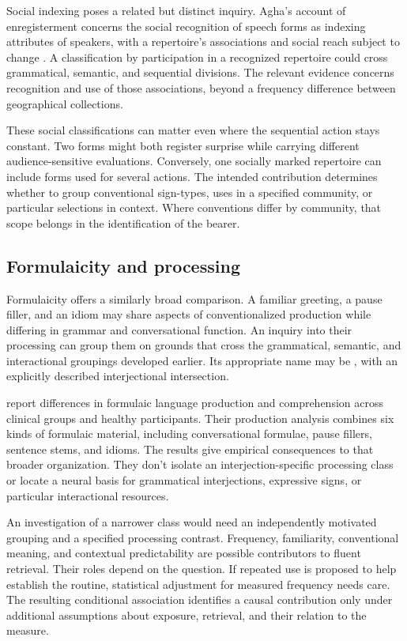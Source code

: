 \documentclass[12pt]{article}
\begin{document}
Social indexing poses a related but distinct inquiry. Agha's account
of enregisterment concerns the social recognition of speech forms as
indexing attributes of speakers, with a repertoire's associations and
social reach subject to change \citep[38--40]{agha2005}. A classification
by participation in a recognized repertoire could cross grammatical,
semantic, and sequential divisions. The relevant evidence concerns
recognition and use of those associations, beyond a frequency difference
between geographical collections.

These social classifications can matter even where the sequential
action stays constant. Two forms might both register surprise while
carrying different audience-sensitive evaluations. Conversely, one
socially marked repertoire can include forms used for several actions.
The intended contribution determines whether to group conventional
sign-types, uses in a specified community, or particular selections
in context. Where conventions differ by community, that scope belongs
in the identification of the bearer.

\subsection{Formulaicity and processing}

Formulaicity offers a similarly broad comparison. A familiar greeting,
a pause filler, and an idiom may share aspects of conventionalized
production while differing in grammar and conversational function.
An inquiry into their processing can group them on grounds that
cross the grammatical, semantic, and interactional groupings developed earlier. Its appropriate
name may be , with an explicitly described
interjectional intersection.

\textcite{vanlanckersidtis2015} report differences in formulaic
language production and comprehension across clinical groups and
healthy participants. Their production
analysis combines six kinds of formulaic material, including conversational
formulae, pause fillers, sentence stems, and idioms. The results give
empirical consequences to that broader organization. They don't
isolate an interjection-specific processing class or locate a neural
basis for grammatical interjections, expressive signs, or particular interactional resources.

An investigation of a narrower class would need an independently
motivated grouping and a specified processing contrast. Frequency,
familiarity, conventional meaning, and contextual predictability are
possible contributors to fluent retrieval. Their roles depend on
the question. If repeated use is proposed to help establish the
routine, statistical adjustment for measured frequency needs care.
The resulting conditional association identifies a causal contribution
only under additional assumptions about exposure, retrieval, and their
relation to the measure.
\end{document}
